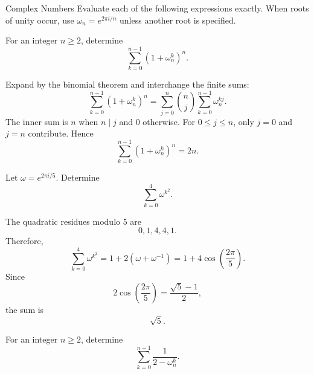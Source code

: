     \begin{expectedproblemgroup}{Complex Numbers}
        Evaluate each of the following expressions exactly. When roots of unity
        occur, use $\omega_n=e^{2\pi i/n}$ unless another root is specified.



        \begin{expectedsubproblem}
            For an integer $n\geq2$, determine
            \[
                \sum_{k=0}^{n-1}(1+\omega_n^k)^n.
            \]
        \end{expectedsubproblem}

        \begin{expectedsubsolution}
            Expand by the binomial theorem and interchange the finite sums:
            \[
                \sum_{k=0}^{n-1}(1+\omega_n^k)^n
                =
                \sum_{j=0}^{n}\binom{n}{j}
                \sum_{k=0}^{n-1}\omega_n^{kj}.
            \]
            The inner sum is $n$ when $n\mid j$ and $0$ otherwise. For
            $0\leq j\leq n$, only $j=0$ and $j=n$ contribute. Hence
            \[
                \boxed{
                    \sum_{k=0}^{n-1}(1+\omega_n^k)^n=2n
                }.
            \]
        \end{expectedsubsolution}

        \begin{expectedsubproblem}
            Let $\omega=e^{2\pi i/5}$. Determine
            \[
                \sum_{k=0}^{4}\omega^{k^2}.
            \]
        \end{expectedsubproblem}

        \begin{expectedsubsolution}
            The quadratic residues modulo $5$ are
            \[
                0,1,4,4,1.
            \]
            Therefore,
            \[
                \sum_{k=0}^{4}\omega^{k^2}
                =
                1+2(\omega+\omega^{-1})
                =
                1+4\cos\left(\frac{2\pi}{5}\right).
            \]
            Since
            \[
                2\cos\left(\frac{2\pi}{5}\right)
                =
                \frac{\sqrt5-1}{2},
            \]
            the sum is
            \[
                \boxed{\sqrt5}.
            \]
        \end{expectedsubsolution}

        \begin{expectedsubproblem}
            For an integer $n\geq2$, determine
            \[
                \sum_{k=0}^{n-1}\frac{1}{2-\omega_n^k}.
            \]
        \end{expectedsubproblem}


\end{expectedproblemgroup}

